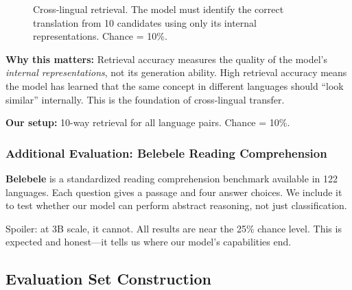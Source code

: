 \documentclass[11pt,a4paper]{article}
\begin{document}
\begin{figure}[H]
\centering
{}
\caption{Cross-lingual retrieval. The model must identify the correct translation from 10 candidates using only its internal representations. Chance = 10\%.}
\label{fig:retrieval}
\end{figure}

\textbf{Why this matters:} Retrieval accuracy measures the quality of the model's \emph{internal representations}, not its generation ability. High retrieval accuracy means the model has learned that the same concept in different languages should ``look similar'' internally. This is the foundation of cross-lingual transfer.

\textbf{Our setup:} 10-way retrieval for all language pairs. Chance = 10\%.

\subsubsection{Additional Evaluation: Belebele Reading Comprehension}

\textbf{Belebele} \citep{bandarkar2023belebele} is a standardized reading comprehension benchmark available in 122 languages. Each question gives a passage and four answer choices. We include it to test whether our model can perform abstract reasoning, not just classification.

Spoiler: at 3B scale, it cannot. All results are near the 25\% chance level. This is expected and honest---it tells us where our model's capabilities end.

\subsection{Evaluation Set Construction}
\end{document}
